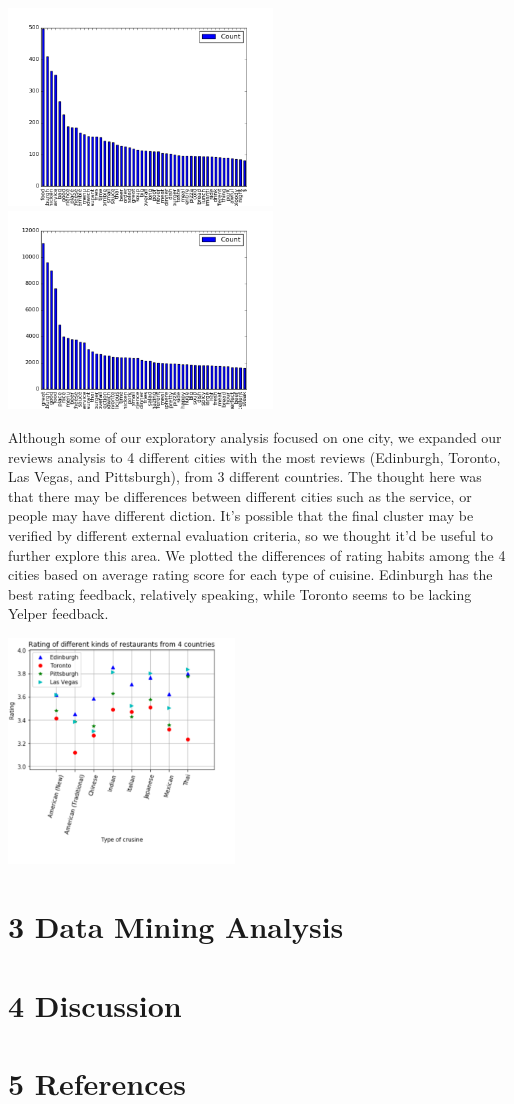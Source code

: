 \documentclass{neu_handout}
\begin{document}
\begin{center}
\includegraphics[width=70mm,scale=0.5]{top50_negativereviews}
\includegraphics[width=70mm,scale=0.5]{top50_positivereviews}
\end{center}

Although some of our exploratory analysis focused on one city, we expanded our reviews analysis to 4 different cities with the most reviews (Edinburgh, Toronto, Las Vegas, and Pittsburgh), from 3 different countries. The thought here was that there may be differences between different cities such as the service, or people may have different diction. It's possible that the final cluster may be verified by different external evaluation criteria, so we thought it'd be useful to further explore this area. We plotted the differences of rating habits among the 4 cities based on average rating score for each type of cuisine. Edinburgh has the best rating feedback, relatively speaking, while Toronto seems to be lacking Yelper feedback.

\begin{center}
	\includegraphics[width=60mm,scale=0.5]{Rating_different_restaurants_countries.png}
\end{center}

\section*{3 Data Mining Analysis}


\section*{4 Discussion}


\section*{5 References}
\end{document}
